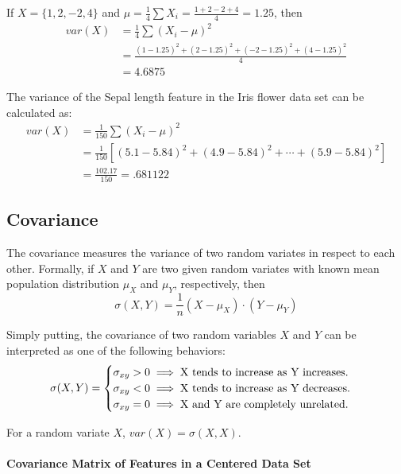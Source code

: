 \begin{example}
	If $X=\{1, 2, -2, 4\}$ and $\mu = \frac{1}{4} \sum X_i = \frac{1+2-2+4}{4} = 1.25$, then
	\begin{align*}
	var(X) &= \frac{1}{4} \sum (X_i - \mu)^2 \\
	&= \frac{(1-1.25)^2 + (2-1.25)^2 + (-2-1.25)^2 + (4-1.25)^2}{4} \\
	&= 4.6875
	\end{align*}
\end{example}

\begin{example}
	The variance of the Sepal length feature in the Iris flower data set can be calculated as:
	\begin{align*}
	var(X) &= \frac{1}{150} \sum (X_i - \mu)^2 \\
	&= \frac{1}{150} [(5.1-5.84)^2 + (4.9-5.84)^2 + \cdots + (5.9-5.84)^2] \\
	&= \frac{102.17}{150} = .681122
	\end{align*}
\end{example}

\subsection{Covariance}

The covariance measures the variance of two random variates in respect to each other. Formally, if $X$ and $Y$ are two given random variates with known mean population distribution $\mu_X$ and $\mu_Y$, respectively, then
$$\sigma(X, Y) = \frac{1}{n} (X - \mu_X) \cdot (Y - \mu_Y) $$

Simply putting, the covariance of two random variables $X$ and $Y$ can be interpreted as one of the following behaviors:
$$
\sigma(X,Y) = \begin{cases}
\sigma_{xy} > 0 \implies \textnormal{X tends to increase as Y increases.}\\
\sigma_{xy} < 0 \implies \textnormal{X tends to increase as Y decreases.}\\
\sigma_{xy} = 0 \implies \textnormal{X and Y are completely unrelated.}
\end{cases}
$$

\begin{remark}
	For a random variate $X$, $var(X) = \sigma(X, X)$.
\end{remark}

\paragraph{Covariance Matrix of Features in a Centered Data Set}

